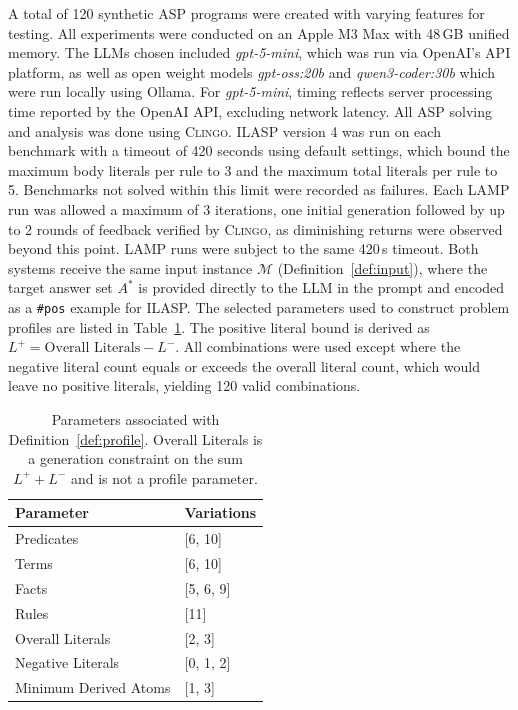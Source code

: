 \documentclass[11pt,a4paper]{article}
\begin{document}
A total of 120 synthetic ASP programs were created with varying features for testing. All experiments were conducted on an Apple M3 Max with 48\,GB unified memory. The LLMs chosen included \textit{gpt-5-mini}, which was run via OpenAI's API platform, as well as open weight models \textit{gpt-oss:20b} and \textit{qwen3-coder:30b} which were run locally using Ollama. For \textit{gpt-5-mini}, timing reflects server processing time reported by the OpenAI API, excluding network latency. All ASP solving and analysis was done using \textsc{Clingo}. ILASP version 4 was run on each benchmark with a timeout of 420 seconds using default settings, which bound the maximum body literals per rule to 3 and the maximum total literals per rule to 5. Benchmarks not solved within this limit were recorded as failures. Each LAMP run was allowed a maximum of 3 iterations, one initial generation followed by up to 2 rounds of feedback verified by \textsc{Clingo}, as diminishing returns were observed beyond this point. LAMP runs were subject to the same 420\,s timeout. Both systems receive the same input instance $\mathcal{M}$ (Definition~\ref{def:input}), where the target answer set $A^*$ is provided directly to the LLM in the prompt and encoded as a \texttt{\#pos} example for ILASP. The selected parameters used to construct problem profiles are listed in Table~\ref{tab:parameters}. The positive literal bound is derived as $L^+ = \text{Overall Literals} - L^-$. All combinations were used except where the negative literal count equals or exceeds the overall literal count, which would leave no positive literals, yielding 120 valid combinations.

\begin{table}[htbp]
    \centering
    \caption{Parameters associated with Definition~\ref{def:profile}. Overall Literals is a generation constraint on the sum $L^+ + L^-$ and is not a profile parameter.}
    \label{tab:parameters}
    \begin{tabular}{ll}
    \toprule
    \textbf{Parameter} & \textbf{Variations} \\
    \midrule
    Predicates & [6, 10] \\
    Terms & [6, 10] \\
    Facts & [5, 6, 9] \\
    Rules & [11] \\
    Overall Literals & [2, 3] \\
    Negative Literals & [0, 1, 2] \\
    Minimum Derived Atoms & [1, 3] \\
    \bottomrule
    \end{tabular}
\end{table}
\end{document}
